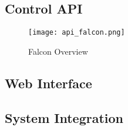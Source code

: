 \subsection{Control API}

\begin{figure}[!htb]
\begin{center}
\texttt{[image: api\_falcon.png]}
\end{center}
\caption{Falcon Overview \cite{falcon-big-picture}}
\label{fig:api-falcon}
\end{figure}


\subsection{Web Interface}

\subsection{System Integration}